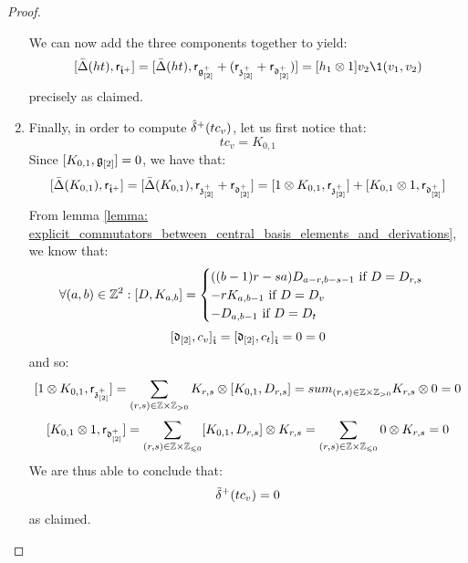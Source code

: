 \begin{proof}
\begin{enumerate}
                    We can now add the three components together to yield:
                        $$[\bar{\Delta}(ht), \sfr_{\extendedtoroidal^{\positive}}] = [ \bar{\Delta}(ht), \sfr_{\g_{[2]}^{\positive}} + (\sfr_{\z_{[2]}^{\positive}} + \sfr_{\d_{[2]}^{\positive}}) ] =  [h_1 \tensor 1] v_2 \1(v_1, v_2)$$
                    precisely as claimed. 
                    
                    \item Finally, in order to compute $\hat{\delta}^{+}(t c_v)$, let us first notice that:
                        $$t c_v = K_{0, 1}$$
                    Since $[K_{0, 1}, \mathfrak{g}_{[2]}] = 0$, we have that:
                        $$[\bar{\Delta}(K_{0, 1}), \sfr_{\extendedtoroidal^{\positive}}] = [\bar{\Delta}(K_{0, 1}), \sfr_{\z_{[2]}^{\positive}} + \sfr_{\d_{[2]}^{\positive}}] = [1 \tensor K_{0, 1}, \sfr_{\z_{[2]}^{\positive}}] + [K_{0, 1} \tensor 1, \sfr_{\d_{[2]}^{\positive}}]$$
                    From lemma \ref{lemma: explicit_commutators_between_central_basis_elements_and_derivations}, we know that:
                        $$
                            \forall (a, b) \in \mathbb{Z}^2: [D, K_{a, b}] =
                            \begin{cases}
                                \text{$((b - 1)r - sa) D_{a - r, b - s - 1}$ if $D = D_{r, s}$}
                                \\
                                \text{$-r K_{a, b - 1}$ if $D = D_v$}
                                \\
                                \text{$- D_{a, b - 1}$ if $D = D_t$}
                            \end{cases}
                        $$
                        $$[\mathfrak{d}_{[2]}, c_v]_{\hat{\mathfrak{t}}} = [\mathfrak{d}_{[2]}, c_t]_{\hat{\mathfrak{t}}} = 0 = 0$$
                    and so:
                        $$[1 \tensor K_{0, 1}, \sfr_{\z_{[2]}^{\positive}}] = \sum_{(r, s) \in \Z \x \Z_{> 0}} K_{r, s} \tensor [K_{0, 1}, D_{r, s}] = sum_{(r, s) \in \Z \x \Z_{> 0}} K_{r, s} \tensor 0 = 0$$
                        $$[K_{0, 1} \tensor 1, \sfr_{\d_{[2]}^{\positive}}] = \sum_{(r, s) \in \Z \x \Z_{\leq 0}} [K_{0, 1}, D_{r, s}] \tensor K_{r, s} = \sum_{(r, s) \in \Z \x \Z_{\leq 0}} 0 \tensor K_{r, s} = 0$$
                    We are thus able to conclude that:
                        $$\tilde{\delta}^{+}(t c_v) = 0$$
                    as claimed.
                \end{enumerate}
            \end{proof}

